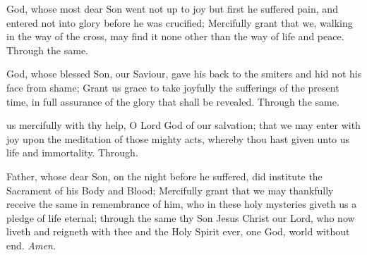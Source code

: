 	 God, whose most dear Son went not up to joy but first he suffered pain, and entered not into glory before he was crucified; Mercifully grant that we, walking in the way of the cross, may find it none other than the way of life and peace. Through the same.
	\clearpage
	\par\noindent

	 God, whose blessed Son, our Saviour, gave his back to the smiters and hid not his face from shame; Grant us grace to take joyfully the sufferings of the present time, in full assurance of the glory that shall be revealed. Through the same.
	
	\par\noindent

     us mercifully with thy help, O Lord God of our salvation; that we may enter with joy upon the meditation of those mighty acts, whereby thou hast given unto us life and immortality. Through.
	
    \par\noindent

     Father, whose dear Son, on the night before he suffered, did institute the Sacrament of his Body and Blood; Mercifully grant that we may thankfully receive the same in remembrance of him, who in these holy mysteries giveth us a pledge of life eternal; through the same thy Son Jesus Christ our Lord, who now liveth and reigneth with thee and the Holy Spirit ever, one God, world without end. \textit{Amen.}
    
